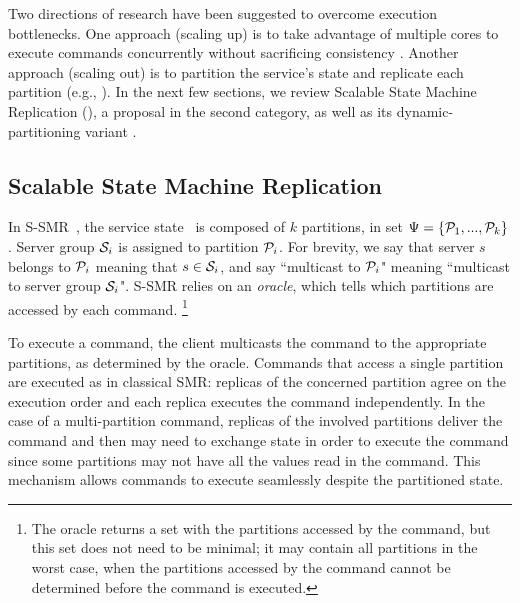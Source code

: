 Two directions of research have been suggested to overcome execution bottlenecks. One approach (scaling up) is to take advantage of multiple cores to execute commands concurrently without sacrificing consistency \cite{Kapritsos:2012um,Marandi:2014bj,Kotla:2004ep,Guo:2014jp}.
Another approach (scaling out) is to partition the service's state and replicate each partition (e.g., \cite{Glendenning:2011kj,Marandi:2011dj}). In the next few sections, we review Scalable State Machine Replication (\ssmr), a proposal in the second category, as well as its dynamic-partitioning variant \dssmr.

\subsection{Scalable State Machine Replication}
\label{sec:ssmr}

In S-SMR~\cite{bezerra2014ssmr}, the service state \vvt\ is composed of $k$ partitions, in set $\Psi = \{\mathcal{P}_1, ..., \mathcal{P}_k\}$. Server group $\mathcal{S}_i$ is assigned to partition $\mathcal{P}_i$. For brevity, we say that server $s$ belongs to $\mathcal{P}_i$ meaning that $s \in \mathcal{S}_i$, and say ``multicast to $\mathcal{P}_i$" meaning ``multicast to server group $\mathcal{S}_i$".
S-SMR relies on an \emph{oracle}, which tells which partitions are accessed by each command.%
\footnote{The oracle returns a set with the partitions accessed by the command, but this set does not need to be minimal; it may contain all partitions in the worst case, when the partitions accessed by the command cannot be determined before the command is executed.}

To execute a command, the client multicasts the command to the appropriate partitions, as determined by the oracle.
Commands that access a single partition are executed as in classical SMR: replicas of the concerned partition agree on the execution order and each replica executes the command independently.
In the case of a multi-partition command, replicas of the involved partitions deliver the command and then may need to exchange state in order to execute the command since some partitions may not have all the values read in the command.
This mechanism allows commands to execute seamlessly despite the partitioned state.




